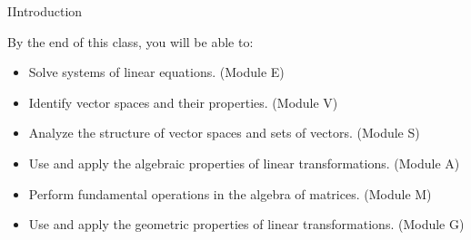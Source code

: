 \begin{module}{I}{Introduction}
\begin{applicationActivities}
\begin{remark}
  By the end of this class, you will be able to:
  \begin{itemize}
  \item Solve systems of linear equations.
        (Module E)
  \item Identify vector spaces and their properties.
        (Module V)
  \item Analyze the structure of vector spaces and sets of vectors.
        (Module S)
  \item Use and apply the algebraic properties of linear transformations.
        (Module A)
  \item Perform fundamental operations in the algebra of matrices.
        (Module M)
  \item Use and apply the geometric properties of linear transformations.
        (Module G)
  \end{itemize}
\end{remark}

\end{applicationActivities}
\end{module}
